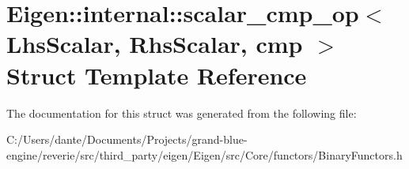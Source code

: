 \hypertarget{struct_eigen_1_1internal_1_1scalar__cmp__op}{}\section{Eigen\+::internal\+::scalar\+\_\+cmp\+\_\+op$<$ Lhs\+Scalar, Rhs\+Scalar, cmp $>$ Struct Template Reference}
\label{struct_eigen_1_1internal_1_1scalar__cmp__op}


The documentation for this struct was generated from the following file\+:\begin{DoxyCompactItemize}
\item 
C\+:/\+Users/dante/\+Documents/\+Projects/grand-\/blue-\/engine/reverie/src/third\+\_\+party/eigen/\+Eigen/src/\+Core/functors/Binary\+Functors.\+h\end{DoxyCompactItemize}
